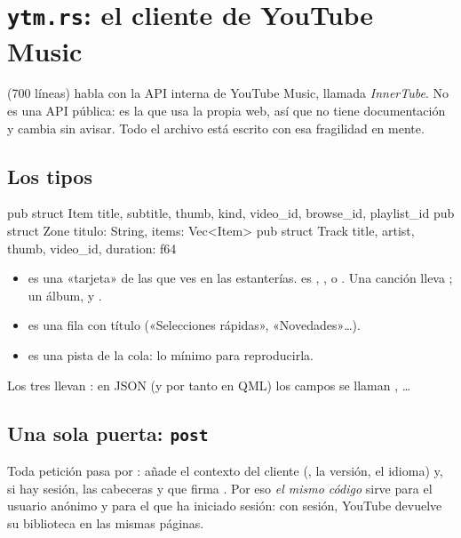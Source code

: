 \section{\texttt{ytm.rs}: el cliente de YouTube Music}

 (700 líneas) habla con la API interna de YouTube Music, llamada
\emph{InnerTube}. No es una API pública: es la que usa la propia web, así que no tiene
documentación y cambia sin avisar. Todo el archivo está escrito con esa fragilidad en mente.

\subsection{Los tipos}

\begin{rust}
pub struct Item { title, subtitle, thumb, kind, video_id, browse_id, playlist_id }
pub struct Zone { titulo: String, items: Vec<Item> }
pub struct Track { title, artist, thumb, video_id, duration: f64 }
\end{rust}

\begin{itemize}
  \item {} es una «tarjeta» de las que ves en las estanterías.  es
  , ,  o . Una canción lleva
  ; un álbum,  y .
  \item {} es una fila con título («Selecciones rápidas», «Novedades»\dots).
  \item {} es una pista de la cola: lo mínimo para reproducirla.
\end{itemize}

Los tres llevan \cod{#[serde(rename_all = "camelCase")]}: en JSON (y por tanto en QML) los
campos se llaman , \dots

\subsection{Una sola puerta: \texttt{post}}

Toda petición pasa por : añade el contexto del cliente
(, la versión, el idioma) y, si hay sesión, las cabeceras  y
 que firma . Por eso \emph{el mismo código}
sirve para el usuario anónimo y para el que ha iniciado sesión: con sesión, YouTube devuelve
su biblioteca en las mismas páginas.

